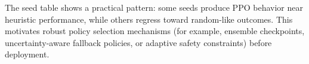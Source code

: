 \begin{table}[H]
\centering

\caption{Reward trajectory snapshots at selected episode indices for the 60-episode suite.}
\label{tab:trajectory-summary}
\end{table}

\begin{table}[H]
\centering

\caption{Final-difficulty behavior and target tracking statistics in the detailed suite.}
\label{tab:difficulty-summary}
\end{table}

\begin{table}[H]
\centering

\caption{Per-seed mean reward over last five episodes.}
\label{tab:seed-scores}
\end{table}

The seed table shows a practical pattern: some seeds produce PPO behavior near heuristic performance, while others regress toward random-like outcomes. This motivates robust policy selection mechanisms (for example, ensemble checkpoints, uncertainty-aware fallback policies, or adaptive safety constraints) before deployment.

\FloatBarrier
